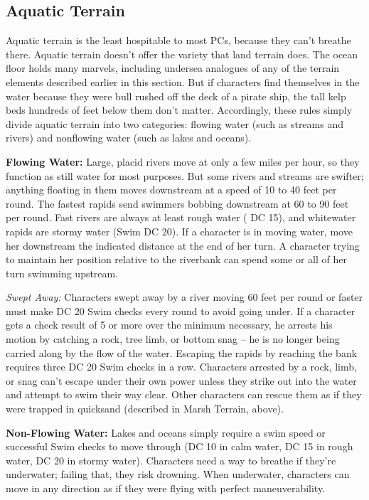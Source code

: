\subsection{Aquatic Terrain}

Aquatic terrain is the least hospitable to most PCs, because they can't breathe 
there. Aquatic terrain doesn't offer the variety that land terrain does. The ocean 
floor holds many marvels, including undersea analogues of any of the terrain elements 
described earlier in this section. But if characters find themselves in the water 
because they were bull rushed off the deck of a pirate ship, the tall kelp beds 
hundreds of feet below them don't matter. Accordingly, these rules simply divide 
aquatic terrain into two categories: flowing water (such as streams and rivers) 
and nonflowing water (such as lakes and oceans).

\textbf{Flowing Water:} Large, placid rivers move at only a few miles per hour, 
so they function as still water for most purposes. But some rivers and streams 
are swifter; anything floating in them moves downstream at a speed of 10 to 40 
feet per round. The fastest rapids send swimmers bobbing downstream at 60 to 90 
feet per round. Fast rivers are always at least rough water ( DC 15), and whitewater 
rapids are stormy water (Swim DC 20). If a character is in moving water, move her 
downstream the indicated distance at the end of her turn. A character trying to 
maintain her position relative to the riverbank can spend some or all of her turn 
swimming upstream.

\textit{Swept Away:} Characters swept away by a river moving 60 feet per round 
or faster must make DC 20 Swim checks every round to avoid going under. If a character 
gets a check result of 5 or more over the minimum necessary, he arrests his motion 
by catching a rock, tree limb, or bottom snag -- he is no longer being carried along 
by the flow of the water. Escaping the rapids by reaching the bank requires three 
DC 20 Swim checks in a row. Characters arrested by a rock, limb, or snag can't 
escape under their own power unless they strike out into the water and attempt 
to swim their way clear. Other characters can rescue them as if they were trapped 
in quicksand (described in Marsh Terrain, above). 

\textbf{Non-Flowing Water:} Lakes and oceans simply require a swim speed or successful 
Swim checks to move through (DC 10 in calm water, DC 15 in rough water, DC 20 in 
stormy water). Characters need a way to breathe if they're underwater; failing 
that, they risk drowning. When underwater, characters can move in any direction 
as if they were flying with perfect maneuverability.

